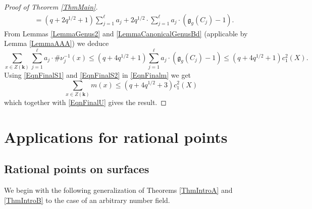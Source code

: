\documentclass[11pt]{amsart}
\theoremstyle{remark}
\numberwithin{equation}{section}
\newcommand{\gfrak}{\mathfrak{g}}
\newcommand{\kk}{\mathbf{k}}
\begin{document}
\begin{proof}[Proof of Theorem \ref{ThmMain}]
$$\begin{aligned}
&= (q+2q^{1/2}+1)\sum_{j=1}^\ell a_j + 2q^{1/2}\cdot \sum_{j=1}^\ell a_j\cdot (\gfrak_g(C_j)-1).
\end{aligned}
$$
From Lemmas \ref{LemmaGenus2} and \ref{LemmaCanonicalGenusBd} (applicable by Lemma \ref{LemmaAAA}) we deduce
\begin{equation}\label{EqnFinalS2}
\sum_{x\in Z(\kk)} \sum_{j=1}^\ell a_j\cdot \#\nu_j^{-1}(x) \le (q+4q^{1/2}+1)\sum_{j=1}^\ell a_j\cdot (\gfrak_g(C_j)-1)\le (q+4q^{1/2}+1)c_1^2(X).
\end{equation}
Using \eqref{EqnFinalS1} and \eqref{EqnFinalS2} in \eqref{EqnFinalm} we get
$$
\sum_{x\in Z(\kk)} m(x)\le (q+4q^{1/2}+3)c_1^2(X)
$$
which together with \eqref{EqnFinalU} gives the result.
\end{proof}



\section{Applications for rational points} \label{SecApplications}



\subsection{Rational points on surfaces} \label{SecApp1} We begin with the following generalization of Theorems \ref{ThmIntroA} and \ref{ThmIntroB} to the case of an arbitrary number field.
\end{document}
